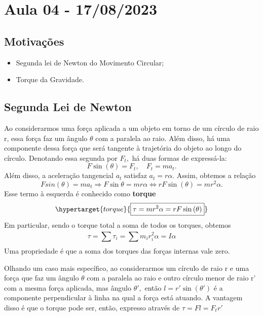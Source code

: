 \documentclass{article}
\begin{document}
\section{Aula 04 - 17/08/2023}
\subsection{Motivações }
\begin{itemize}
  \item Segunda lei de Newton do Movimento Circular;
  \item Torque da Gravidade.
\end{itemize}
\subsection{Segunda Lei de Newton}
Ao considerarmos uma força aplicada a um objeto em torno de um círculo de raio r, essa força faz um ângulo
 \(\theta \) com a paralela ao raio. Além disso, há uma componente dessa força que será tangente 
 à trajetória do objeto ao longo do círculo. Denotando essa segunda por \(F_{t},\) há duas formas de expressá-la: 
   \[
     F\sin{(\theta )} = F_{t},\quad F_{t} = ma_{t}.
   \]
   Além disso, a aceleração tangencial \(a_{t}\) satisfaz \(a_{t} = r\alpha \). Assim, obtemos a relação 
     \[
       F sin(\theta ) = ma_{t} \Rightarrow F\sin{\theta } = mr\alpha \Longleftrightarrow rF\sin{(\theta )} = mr^{2}\alpha.
     \]
     Esse termo à esquerda é conhecido como \textbf{torque} 
       \[
         \hypertarget{torque}{\boxed{\tau = mr^{2}\alpha = rF\sin{(\theta )}}}
       \]
  Em particular, sendo o torque total a soma de todos os torques, obtemos 
    \[
      \tau = \sum\limits_{}^{}\tau_{i} = \sum\limits_{}^{}m_{i}r_{i}^{2}\alpha = I\alpha 
    \]
    Uma propriedade é que a soma dos torques das forças internas vale zero.

    Olhando um caso mais específico, ao considerarmos um círculo de raio r e uma força que
faz um ângulo \(\theta \) com a paralela ao raio e outro círculo menor de raio r' com a mesma força aplicada,
mas ângulo \(\theta ',\) então \(l=r'\sin{(\theta ')}\) é a componente perpendicular à linha na qual a força está atuando.
  A vantagem disso é que o torque pode ser, então, expresso através de \(\tau = Fl = F_{t}r'\)
\end{document}
